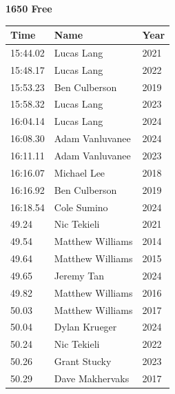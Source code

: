 \vspace{1.2em}
\noindent\begin{minipage}[t]{0.48\textwidth}
\centering
\textbf{\textcolor{teamprimary}{1650 Free}}\par
\vspace{0.5em}
\centering
\small
\renewcommand{\arraystretch}{1.0}
\setlength{\tabcolsep}{4pt}
\begin{tabular}{@{}p{1.8cm}p{3.0cm}p{1.0cm}@{}}
\toprule
\textbf{Time} & \textbf{Name} & \textbf{Year} \\
\midrule
15:44.02 & Lucas Lang & 2021 \\
15:48.17 & Lucas Lang & 2022 \\
15:53.23 & Ben Culberson & 2019 \\
15:58.32 & Lucas Lang & 2023 \\
16:04.14 & Lucas Lang & 2024 \\
16:08.30 & Adam Vanluvanee & 2024 \\
16:11.11 & Adam Vanluvanee & 2023 \\
16:16.07 & Michael Lee & 2018 \\
16:16.92 & Ben Culberson & 2019 \\
16:18.54 & Cole Sumino & 2024 \\
49.24 & Nic Tekieli & 2021 \\
49.54 & Matthew Williams & 2014 \\
49.64 & Matthew Williams & 2015 \\
49.65 & Jeremy Tan & 2024 \\
49.82 & Matthew Williams & 2016 \\
50.03 & Matthew Williams & 2017 \\
50.04 & Dylan Krueger & 2024 \\
50.24 & Nic Tekieli & 2022 \\
50.26 & Grant Stucky & 2023 \\
50.29 & Dave Makhervaks & 2017 \\
\bottomrule
\end{tabular}
\end{minipage}
\hfill
